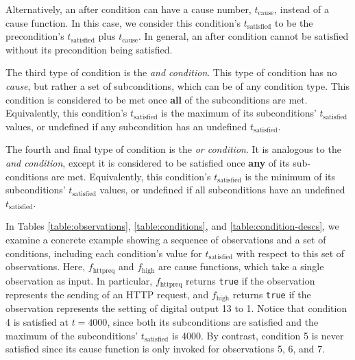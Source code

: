 \documentclass[12pt]{article}
\begin{document}
Alternatively, an after condition can have a cause number, $t_{\text{cause}}$, instead of a cause function.  In this case, we consider this condition's $t_{\text{satisfied}}$ to be the precondition's $t_{\text{satisfied}}$ plus $t_{\text{cause}}$.  In general, an after condition cannot be satisfied without its precondition being satisfied.

The third type of condition is the \textit{and condition}.  This type of condition has no \textit{cause}, but rather a set of subconditions, which can be of any condition type.  This condition is considered to be met once \textbf{all} of the subconditions are met.  Equivalently, this condition's $t_{\text{satisfied}}$ is the maximum of its subconditions' $t_{\text{satisfied}}$ values, or undefined if any subcondition has an undefined $t_{\text{satisfied}}$.

The fourth and final type of condition is the \textit{or condition}.  It is analogous to the \textit{and condition}, except it is considered to be satisfied once \textbf{any} of its sub-conditions are met. Equivalently, this condition's $t_{\text{satisfied}}$ is the minimum of its subconditions' $t_{\text{satisfied}}$ values, or undefined if all subconditions have an undefined $t_{\text{satisfied}}$.

In Tables \ref{table:observations}, \ref{table:conditions}, and \ref{table:condition-descs}, we examine a concrete example showing a sequence of observations and a set of conditions, including each condition's value for $t_{\text{satisfied}}$ with respect to this set of observations.  Here, $f_{\text{httpreq}}$ and $f_{\text{high}}$ are cause functions, which take a single observation as input.  In particular, $f_{\text{httpreq}}$ returns \texttt{true} if the observation represents the sending of an HTTP request, and $f_{\text{high}}$ returns \texttt{true} if the observation represents the setting of digital output 13 to 1.  Notice that condition 4 is satisfied at $t=4000$, since both its subconditions are satisfied and the maximum of the subconditions' $t_{\text{satisfied}}$ is 4000.  By contrast, condition 5 is never satisfied since its cause function is only invoked for observations 5, 6, and 7.
\end{document}
